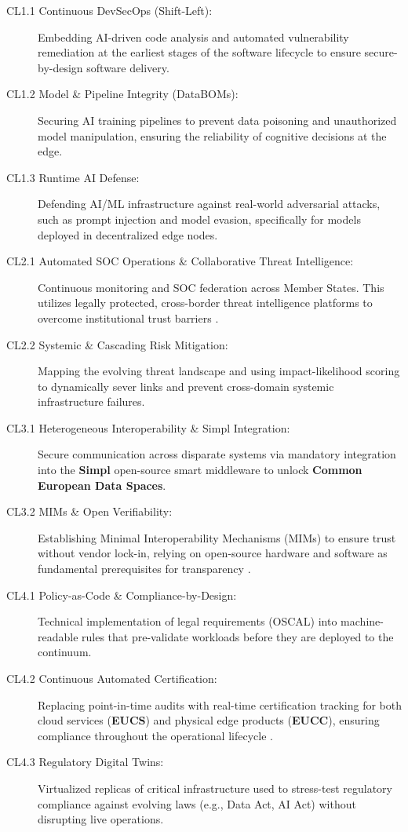 \documentclass[12pt,a4paper]{report}
\begin{document}
\begin{description}
\item[CL1.1 Continuous DevSecOps (Shift-Left):] Embedding AI-driven code analysis and automated vulnerability remediation at the earliest stages of the software lifecycle to ensure secure-by-design software delivery.

\item[CL1.2 Model \& Pipeline Integrity (DataBOMs):] Securing AI training pipelines to prevent data poisoning and unauthorized model manipulation, ensuring the reliability of cognitive decisions at the edge.

\item[CL1.3 Runtime AI Defense:] Defending AI/ML infrastructure against real-world adversarial attacks, such as prompt injection and model evasion, specifically for models deployed in decentralized edge nodes.

\item[CL2.1 Automated SOC Operations \& Collaborative Threat Intelligence:] Continuous monitoring and SOC federation across Member States. This utilizes legally protected, cross-border threat intelligence platforms to overcome institutional trust barriers \cite{concordia}.

\item[CL2.2 Systemic \& Cascading Risk Mitigation:] Mapping the evolving threat landscape and using impact-likelihood scoring to dynamically sever links and prevent cross-domain systemic infrastructure failures.

\item[CL3.1 Heterogeneous Interoperability \& Simpl Integration:] Secure communication across disparate systems via mandatory integration into the \textbf{Simpl} open-source smart middleware \cite{cloud_edge_roadmap} to unlock \textbf{Common European Data Spaces}.

\item[CL3.2 MIMs \& Open Verifiability:] Establishing Minimal Interoperability Mechanisms (MIMs) to ensure trust without vendor lock-in, relying on open-source hardware and software as fundamental prerequisites for transparency \cite{cloud_edge_roadmap}.

\item[CL4.1 Policy-as-Code \& Compliance-by-Design:] Technical implementation of legal requirements (OSCAL) into machine-readable rules that pre-validate workloads before they are deployed to the continuum.

\item[CL4.2 Continuous Automated Certification:] Replacing point-in-time audits with real-time certification tracking for both cloud services (\textbf{EUCS}) and physical edge products (\textbf{EUCC}), ensuring compliance throughout the operational lifecycle \cite{eucc}.

\item[CL4.3 Regulatory Digital Twins:] Virtualized replicas of critical infrastructure used to stress-test regulatory compliance against evolving laws (e.g., Data Act, AI Act) without disrupting live operations.

\end{description}
\end{document}
